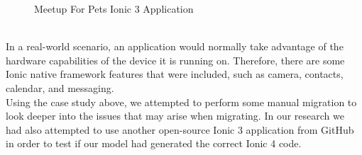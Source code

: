 \documentclass[conference]{IEEEtran}
\begin{document}
\begin{figure}[!htb]
    \qquad
    \caption{Meetup For Pets Ionic 3 Application}%
    \label{fig:meetupIonic}%
\end{figure}
\\ In a real-world scenario, an application would normally take advantage of the hardware capabilities of the device it is running on.
Therefore, there are some Ionic native framework features that were included, such as camera, contacts, calendar, and messaging.
\\ Using the case study above, we attempted to perform some manual migration to look deeper into the issues that may arise when migrating. In our research we had also attempted to use another open-source Ionic 3 application from GitHub \cite{b14} in order to test if our model
had generated the correct Ionic 4 code.
\end{document}
